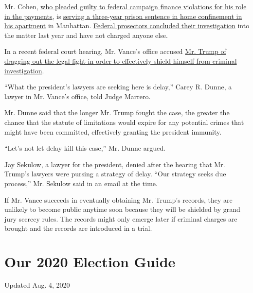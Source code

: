 Mr. Cohen,
\href{https://www.nytimes.com/2018/11/29/nyregion/michael-cohen-trump-russia-mueller.html}{who
pleaded guilty to federal campaign finance violations for his role in
the payments}, is
\href{https://www.nytimes.com/2020/07/23/nyregion/michael-cohen-trump-book.html}{serving
a three-year prison sentence in home confinement in his apartment} in
Manhattan.
\href{https://www.nytimes.com/2019/07/17/nyregion/michael-cohen-trump-investigation.html}{Federal
prosectors concluded their investigation} into the matter last year and
have not charged anyone else.

In a recent federal court hearing, Mr. Vance's office accused
\href{https://www.nytimes.com/2020/07/16/nyregion/donald-trump-taxes-cyrus-vance.html}{Mr.
Trump of dragging out the legal fight in order to effectively shield
himself from criminal investigation}.

``What the president's lawyers are seeking here is delay,'' Carey R.
Dunne, a lawyer in Mr. Vance's office, told Judge Marrero.

Mr. Dunne said that the longer Mr. Trump fought the case, the greater
the chance that the statute of limitations would expire for any
potential crimes that might have been committed, effectively granting
the president immunity.

``Let's not let delay kill this case,'' Mr. Dunne argued.

Jay Sekulow, a lawyer for the president, denied after the hearing that
Mr. Trump's lawyers were pursing a strategy of delay. ``Our strategy
seeks due process,'' Mr. Sekulow said in an email at the time.

If Mr. Vance succeeds in eventually obtaining Mr. Trump's records, they
are unlikely to become public anytime soon because they will be shielded
by grand jury secrecy rules. The records might only emerge later if
criminal charges are brought and the records are introduced in a trial.

\hypertarget{our-2020-election-guide}{%
\section{Our 2020 Election Guide}\label{our-2020-election-guide}}

Updated Aug. 4, 2020


